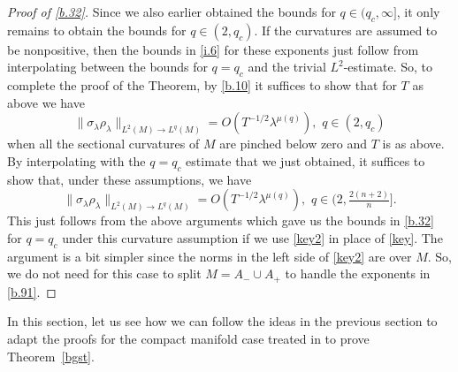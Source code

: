 \documentclass[10pt]{amsart}
\newcommand{\la}{\lambda}
\newcommand{\1}{{\bf 1}}
\begin{document}
\begin{proof}[Proof of \eqref{b.32}]
Since we also earlier obtained the bounds for $q\in (q_c,\infty]$, it only remains to obtain the bounds for
$q\in (2,q_c)$.  If the curvatures are assumed to be nonpositive, then the bounds in \eqref{i.6} for these exponents
just follow from interpolating between the bounds for $q=q_c$ and the trivial $L^2$-estimate.  So, to complete the proof
of the Theorem, by \eqref{b.10} it suffices to show that for $T$ as above we have
$$\| \sigma_\la\rho_\la\|_{L^2(M)\to L^q(M)}=O(T^{-1/2}\la^{\mu(q)}), \, \, q\in (2,q_c)$$
when all the sectional curvatures of $M$ are pinched below zero and $T$ is as above.  By interpolating with the
$q=q_c$ estimate that we just obtained, it suffices to show that, under these assumptions, we have
\begin{equation}\label{b.91} 
\|\sigma_\la \rho_\la \|_{L^2(M)\to L^q(M)}=O(T^{-1/2} \la^{\mu(q)}), \, \, q\in (2,\tfrac{2(n+2)}n].
\end{equation}
This just follows from the above arguments which gave us the bounds in \eqref{b.32} for $q=q_c$ under this curvature assumption
 if we use \eqref{key2} in place of \eqref{key}.   The argument is  a bit simpler since the norms in the left side of 
 \eqref{key2} are over $M$.   So, we do not need for this case to split $M=A_-\cup A_+$ to handle the exponents in \eqref{b.91}.
\end{proof}














\bigskip












\bigskip




In this section, let us see how we can follow the ideas in the previous section to adapt the proofs for the compact manifold case treated in \cite{blair2023strichartz,HSst}
to prove Theorem~\ref{bgst}.
\end{document}
